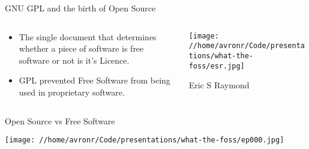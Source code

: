 \documentclass[presentation]{beamer}
\begin{document}
\begin{frame}[label={sec:orge08456e}]{GNU GPL and the birth of Open Source}
\begin{columns}
\begin{column}{0.6\columnwidth}
\begin{itemize}
\item The single document that determines whether a piece of software is free software or not is it's Licence.
\item GPL prevented Free Software from being used in proprietary software.
\end{itemize}
\end{column}
\begin{column}{0.4\columnwidth}
\begin{center}
\texttt{[image: //home/avronr/Code/presentations/what-the-foss/esr.jpg]}
\end{center}
Eric S Raymond
\end{column}
\end{columns}
\end{frame}
\begin{frame}[label={sec:org851e145}]{Open Source vs Free Software}
\begin{center}
\texttt{[image: //home/avronr/Code/presentations/what-the-foss/ep000.jpg]}
\end{center}
\end{frame}
\end{document}
